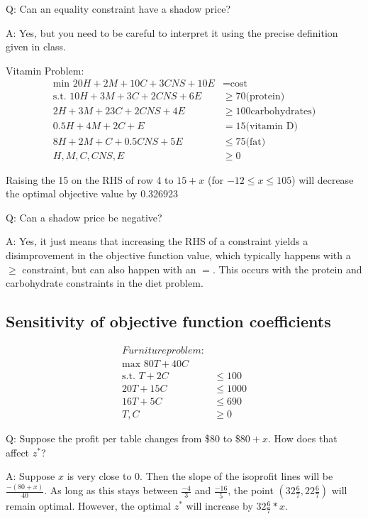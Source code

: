 \documentclass{article}
\begin{document}
Q: Can an equality constraint have a shadow price?

A: Yes, but you need to be careful to interpret it using the precise definition given in class. 

\begin{eg}
    Vitamin Problem: \\
    \begin{align*}
        \text{min }20H+2M+10C+3CNS+10E&=\text{cost} \\
        \text{s.t. }10H+3M+3C+2CNS+6E&\geq 70 \text{(protein)}\\
        2H+3M+23C+2CNS+4E&\geq 100 \text{carbohydrates)} \\
        0.5H+4M+2C+E&=15 \text{(vitamin D)} \\
        8H+2M+C+0.5CNS+5E&\leq 75 \text{(fat)} \\
        H,M,C,CNS,E&\geq 0
    \end{align*}
\end{eg}
\begin{answer}
    Raising the 15 on the RHS of row 4 to \(15+x\) (for \(-12\leq x\leq105\)) will decrease 
    the optimal objective value by 0.326923 
\end{answer}

Q: Can a shadow price be negative? 

A: Yes, it just means that increasing the RHS of a constraint yields a disimprovement in the 
objective function value, which typically happens with a \(\geq\) constraint, but can also happen 
with an \(=\). This occurs with the protein and carbohydrate constraints in the diet problem. 

\subsection{Sensitivity of objective function coefficients}
\begin{align*}
    Furniture problem: \\
    \text{max }80T+40C \\
    \text{s.t. }T+2C&\leq 100 \\
    20T+15C &\leq 1000 \\
    16T+5C &\leq 690 \\
    T,C &\geq 0
\end{align*}

Q: Suppose the profit per table changes from \$80 to \$\(80+x\). How does that affect \(z^*\)? 

A: Suppose \(x\) is very close to 0. Then the slope of the isoprofit lines will be 
\(\frac{-(80+x)}{40}\). As long as this stays between \(\frac{-4}{3}\) and \(\frac{-16}{5}\), the point 
\((32 \frac{6}{7}, 22 \frac{6}{7})\) will remain optimal. However, the optimal \(z^*\) will increase by 
\(32 \frac{6}{7}*x\).
\end{document}
